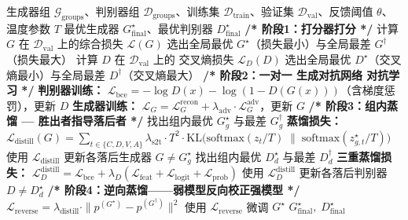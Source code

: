 \begin{algorithm}[H]
\caption{逆向师生蒸馏机制}
\label{alg:rtwave}
\begin{algorithmic}[0]
\Require 生成器组 $\mathcal{G}_{\text{groups}}$、判别器组 $\mathcal{D}_{\text{groups}}$、训练集 $\mathcal{D}_{\text{train}}$、验证集 $\mathcal{D}_{\mathrm{val}}$、反馈阈值 $\theta$、温度参数 $T$
\Ensure 最优生成器 $G^{\star}_{\text{final}}$、最优判别器 $D^{\star}_{\text{final}}$
\Statex
{}
    \Statex
    \State \textbf{/* 阶段1：打分器打分 */}
        \State 计算 $G$ 在 $\mathcal{D}_{\mathrm{val}}$ 上的综合损失 $\mathcal{L}(G)$
    \EndFor
    \State 选出全局最优 $G^{\star}$（损失最小）与全局最差 $G^{\dagger}$（损失最大）
        \State 计算 $D$ 在 $\mathcal{D}_{\mathrm{val}}$ 上的 交叉熵损失 $\mathcal{L}_D(D)$
    \EndFor
    \State 选出全局最优 $D^{\star}$（交叉熵最小）与全局最差 $D^{\dagger}$（交叉熵最大）
    \Statex
    \State \textbf{/* 阶段2：一对一 生成对抗网络 对抗学习 */}
            \State \textbf{判别器训练：} $\mathcal{L}_{\text{bce}} = -\log D(x) - \log(1 - D(G(x)))$（含梯度惩罚），更新 $D$
            \State \textbf{生成器训练：} $\mathcal{L}_G = \mathcal{L}_G^{\text{recon}} + \lambda_{\text{adv}} \cdot \mathcal{L}_G^{\text{adv}}$，更新 $G$
        \EndFor
    \EndFor
    \Statex
    \State \textbf{/* 阶段3：组内蒸馏 — 胜出者指导落后者 */}
        \State 找出组内最优 $G^{\star}_g$ 与最差 $G^{\dagger}_g$
        \State \textbf{蒸馏损失：} $\mathcal{L}_{\text{distill}}(G) = \sum_{t \in \{C,D,V,A\}} \lambda_{\text{s2t}} \cdot T^2 \cdot \mathrm{KL}\big(\mathrm{softmax}(z_t/T) \;\big\|\; \mathrm{softmax}(z^{\star}_{g,t}/T)\big)$
        \State 使用 $\mathcal{L}_{\text{distill}}$ 更新各落后生成器 $G \neq G^{\star}_g$
    \EndFor
        \State 找出组内最优 $D^{\star}_d$ 与最差 $D^{\dagger}_d$
        \State \textbf{三重蒸馏损失：} $\mathcal{L}_D^{\text{distill}} = \mathcal{L}_{\text{bce}} + \lambda_D(\mathcal{L}_{\text{feat}} + \mathcal{L}_{\text{logit}} + \mathcal{L}_{\text{prob}})$
        \State 使用 $\mathcal{L}_D^{\text{distill}}$ 更新各落后判别器 $D \neq D^{\star}_d$
    \EndFor
    \Statex
    \State \textbf{/* 阶段4：逆向蒸馏——弱模型反向校正强模型 */}
        \State $\mathcal{L}_{\text{reverse}} = \lambda_{\text{distill}} \cdot \|p^{(G^{\star})} - p^{(G^{\dagger})}\|^2$
        \State 使用 $\mathcal{L}_{\text{reverse}}$ 微调 $G^{\star}$
    \EndIf
\EndFor
\Statex
\State \Return $G^{\star}_{\text{final}},\; D^{\star}_{\text{final}}$
\end{algorithmic}
\end{algorithm}

